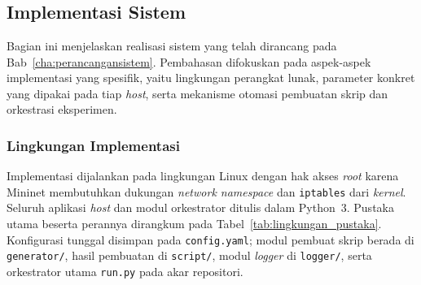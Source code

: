 \chapter{\babEmpat}
\label{cha:Pengujian dan Evaluasi}

\section{Implementasi Sistem}
\label{sec:implementasi_sistem}
Bagian ini menjelaskan realisasi sistem yang telah dirancang pada Bab~\ref{cha:perancangansistem}. Pembahasan difokuskan pada aspek-aspek implementasi yang spesifik, yaitu lingkungan perangkat lunak, parameter konkret yang dipakai pada tiap \textit{host}, serta mekanisme otomasi pembuatan skrip dan orkestrasi eksperimen.

\subsection{Lingkungan Implementasi}
\label{subsec:lingkungan_implementasi}
Implementasi dijalankan pada lingkungan Linux dengan hak akses \textit{root} karena Mininet membutuhkan dukungan \textit{network namespace} dan \texttt{iptables} dari \textit{kernel}. Seluruh aplikasi \textit{host} dan modul orkestrator ditulis dalam Python~3. Pustaka utama beserta perannya dirangkum pada Tabel~\ref{tab:lingkungan_pustaka}. Konfigurasi tunggal disimpan pada \texttt{config.yaml}; modul pembuat skrip berada di \texttt{generator/}, hasil pembuatan di \texttt{script/}, modul \textit{logger} di \texttt{logger/}, serta orkestrator utama \texttt{run.py} pada akar repositori.

